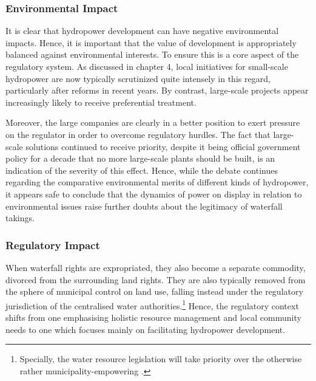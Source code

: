 \subsubsection{Environmental Impact}\label{sec:5:7:6}

It is clear that hydropower development can have negative environmental impacts. Hence, it is important that the value of development is appropriately balanced against environmental interests. To ensure this is a core aspect of the regulatory system. As discussed in chapter 4, local initiatives for small-scale hydropower are now typically scrutinized quite intensely in this regard, particularly after reforms in recent years. By contrast, large-scale projects appear increasingly likely to receive preferential treatment. %
 
Moreover, the large companies are clearly in a better position to exert pressure on the regulator in order to overcome regulatory hurdles. The fact that large-scale solutions continued to receive priority, despite it being official government policy for a decade that no more large-scale plants should be built, is an indication of the severity of this effect. Hence, while the debate continues regarding the comparative environmental merits of different kinds of hydropower, it appears safe to conclude that the dynamics of power on display in relation to environmental issues raise further doubts about the legitimacy of waterfall takings.

\subsubsection{Regulatory Impact}\label{sec:5:7:7}

When waterfall rights are expropriated, they also become a separate commodity, divorced from the surrounding land rights. They are also typically removed from the sphere of municipal control on land use, falling instead under the regulatory jurisdiction of the centralised water authorities.\footnote{Specially, the water resource legislation will take priority over the otherwise rather municipality-empowering \cite{pb08}.} Hence, the regulatory context shifts from one emphasising holistic resource management and local community needs to one which focuses mainly on facilitating hydropower development.

